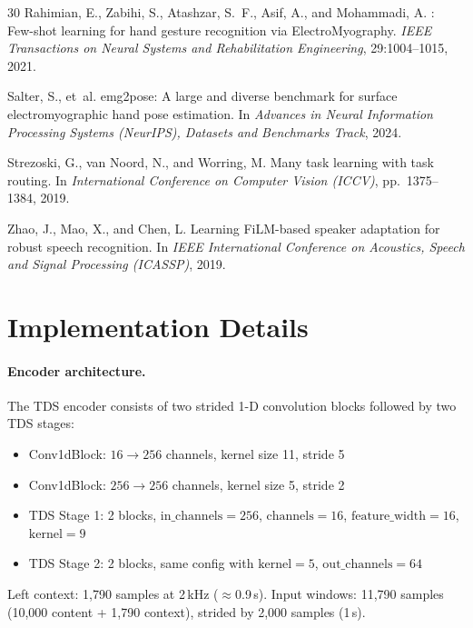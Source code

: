 \documentclass[10pt]{article}
\begin{document}
\begin{thebibliography}{30}
Rahimian, E., Zabihi, S., Atashzar, S.~F., Asif, A., and Mohammadi, A.
: Few-shot learning for hand gesture recognition via {ElectroMyography}.
\newblock \emph{IEEE Transactions on Neural Systems and Rehabilitation Engineering}, 29:1004--1015, 2021.

Salter, S., et~al.
\newblock emg2pose: A large and diverse benchmark for surface electromyographic hand pose estimation.
\newblock In \emph{Advances in Neural Information Processing Systems (NeurIPS), Datasets and Benchmarks Track}, 2024.

Strezoski, G., van Noord, N., and Worring, M.
\newblock Many task learning with task routing.
\newblock In \emph{International Conference on Computer Vision (ICCV)}, pp.\ 1375--1384, 2019.

Zhao, J., Mao, X., and Chen, L.
\newblock Learning {FiLM}-based speaker adaptation for robust speech recognition.
\newblock In \emph{IEEE International Conference on Acoustics, Speech and Signal Processing (ICASSP)}, 2019.

\end{thebibliography}

\newpage
\appendix
\section{Implementation Details}
\label{app:implementation}

\paragraph{Encoder architecture.}
The TDS encoder consists of two strided 1-D convolution blocks followed by two TDS stages:
\begin{itemize}[leftmargin=*,itemsep=1pt]
    \item Conv1dBlock: $16 \rightarrow 256$ channels, kernel size 11, stride 5
    \item Conv1dBlock: $256 \rightarrow 256$ channels, kernel size 5, stride 2
    \item TDS Stage 1: 2 blocks, $\text{in\_channels}{=}256$, $\text{channels}{=}16$, $\text{feature\_width}{=}16$, $\text{kernel}{=}9$
    \item TDS Stage 2: 2 blocks, same config with $\text{kernel}{=}5$, $\text{out\_channels}{=}64$
\end{itemize}
Left context: 1,790 samples at 2\,kHz ($\approx$0.9\,s). Input windows: 11,790 samples (10,000 content + 1,790 context), strided by 2,000 samples (1\,s).
\end{document}
